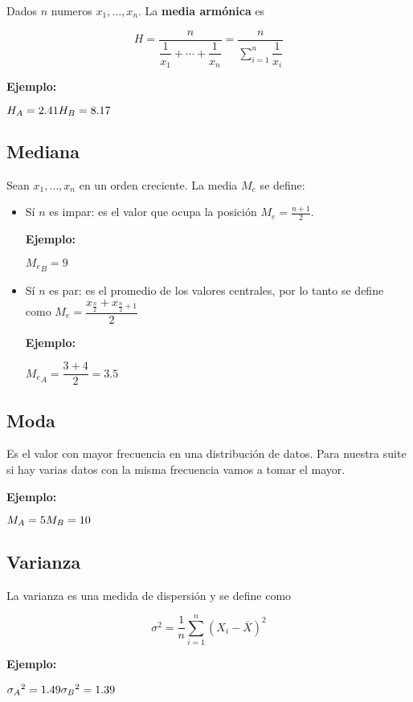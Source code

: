 \documentclass[10pt,a4paper]{article}
\begin{document}
Dados $n$ numeros $x_{1}, \ldots,x_{n}$. La \textbf{media armónica} es

$$ H = \dfrac{n}{ \dfrac{1}{x_1} + \cdots + \dfrac{1}{x_n} } =  \dfrac{n}{ \sum_{i = 1}^{n} \dfrac{1}{x_i} }
$$

\begin{flushleft}
	\textbf{Ejemplo:}
\end{flushleft}
$
H_{A} = 2.41\\
H_{B} = 8.17
$

\subsection{Mediana}

Sean $x_{1}, \ldots,x_{n}$ en un orden creciente. La media $M_e$ se define:
\begin{itemize}
	\item Sí $n$ es impar: es el valor que ocupa la posición $ M_e = \frac{n+1}{2}$.
	\begin{flushleft}
		\textbf{Ejemplo:}
	\end{flushleft}
	$ {M_e}_B = 9 $
	\item Sí $n$ es par: es el promedio de los valores centrales, por lo tanto se define como $ M_e = \dfrac{x_{\frac{n}{2}} + x_{\frac{n}{2}+1} }{2} $
	\begin{flushleft}
		\textbf{Ejemplo:}
	\end{flushleft}
	$ {M_e}_A = \dfrac{3 + 4}{2} = 3.5 $
\end{itemize}

\subsection{Moda}

Es el valor con mayor frecuencia en una distribución de datos. Para nuestra suite si hay varias datos con la misma frecuencia vamos a tomar el mayor.

\begin{flushleft}
	\textbf{Ejemplo:}
\end{flushleft}
$
M_A = 5\\
M_B = 10
$

\subsection{Varianza}

La varianza es una medida de dispersión y se define como

$$ \sigma^2 = \dfrac{1}{n} \sum_{i = 1}^{n} \left(  X_i - \overline{X} \right) ^2 $$
\begin{flushleft}
	\textbf{Ejemplo:}
\end{flushleft}
$
{\sigma_{A}}^2 = 1.49\\
{\sigma_{B}}^2 = 1.39
$
\end{document}
